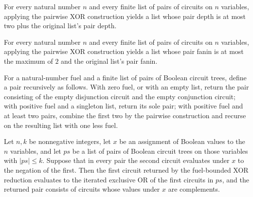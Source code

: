\begin{theorem}
\label{BoolCircuit.pairDepth_xorPairUp}
\leanok
{}
For every natural number $n$ and every finite list of pairs of circuits on $n$
variables, applying the pairwise XOR construction yields a list whose pair depth is at
most two plus the original list's pair depth.
\end{theorem}

\begin{theorem}
\label{BoolCircuit.pairFanin_xorPairUp}
\leanok
{}
For every natural number $n$ and every finite list of pairs of circuits on $n$
variables, applying the pairwise XOR construction yields a list whose pair fanin is at
most the maximum of $2$ and the original list's pair fanin.
\end{theorem}

\begin{definition}
\label{BoolCircuit.xorFuel}
\leanok
{}
For a natural-number fuel and a finite list of pairs of Boolean circuit trees, define a
pair recursively as follows. With zero fuel, or with an empty list, return the pair
consisting of the empty disjunction circuit and the empty conjunction circuit; with
positive fuel and a singleton list, return its sole pair; with positive fuel and at
least two pairs, combine the first two by the pairwise construction and recurse on the
resulting list with one less fuel.
\end{definition}

\begin{theorem}
\label{BoolCircuit.xorFuel_eval}
\leanok
{}
Let $n,k$ be nonnegative integers, let $x$ be an assignment of Boolean values to the $n$
variables, and let $ps$ be a list of pairs of Boolean circuit trees on those variables
with $|ps|\le k$. Suppose that in every pair the second circuit evaluates under $x$ to
the negation of the first. Then the first circuit returned by the fuel-bounded XOR
reduction evaluates to the iterated exclusive OR of the first circuits in $ps$, and the
returned pair consists of circuits whose values under $x$ are complements.
\end{theorem}

